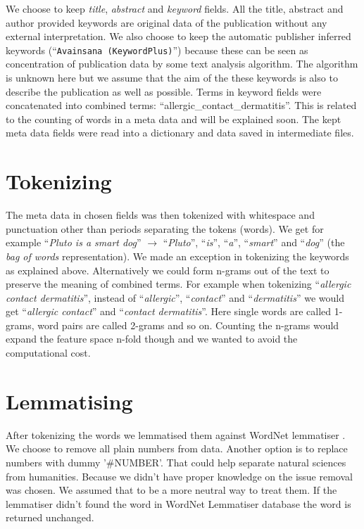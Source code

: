 We choose to keep \emph{title}, \emph{abstract} and 
\emph{keyword} fields. All the title, abstract and author 
provided keywords are original data of the publication without 
any external interpretation. We also choose to keep the automatic 
publisher inferred keywords (``\texttt{Avainsana 
(KeywordPlus)}'') because these can be seen as concentration of 
publication data by some text analysis algorithm. The algorithm is 
unknown here but we assume that the aim of the these keywords is 
also to describe the publication as well as possible. 
Terms in keyword fields were concatenated into combined terms: 
``allergic\_contact\_dermatitis''. This is related to the counting 
of words in a meta data and will be explained soon. The kept 
meta data fields were read into a dictionary and data saved in 
intermediate files.

\section{Tokenizing}
The meta data in chosen fields was then tokenized with whitespace 
and punctuation other than periods separating the tokens (words). 
We get for example ``\emph{Pluto is a smart dog}'' $\rightarrow$ 
``\emph{Pluto}'', ``\emph{is}'', ``\emph{a}'', ``\emph{smart}'' 
and ``\emph{dog}'' (the \emph{bag of words} representation).
We made an exception in tokenizing the keywords as explained above.
Alternatively we could form n-grams out of the text to preserve 
the meaning of combined terms. For example when tokenizing 
``\emph{allergic contact dermatitis}'', instead of 
``\emph{allergic}'', ``\emph{contact}'' and 
``\emph{dermatitis}'' we would get ``\emph{allergic contact}'' 
and ``\emph{contact dermatitis}''. Here single words are called 
1-grams, word pairs are called 2-grams and so on. Counting the 
n-grams would expand the feature space n-fold though and we wanted 
to avoid the computational cost. 

\section{Lemmatising}
After tokenizing the words we lemmatised them against WordNet 
lemmatiser \cite{noauthor_princeton_2010}.
We choose to remove all plain numbers from
data. Another option is to replace numbers with dummy '\#NUMBER'.
That could help separate natural sciences from humanities. Because 
we didn't have proper knowledge on the issue removal was chosen. 
We assumed that to be a more neutral way to treat them. 
If the lemmatiser didn't found the word in WordNet Lemmatiser 
database the word is returned unchanged. 

